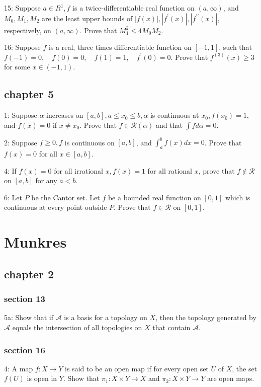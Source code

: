 \documentclass{article}
\begin{document}
15: Suppose $a \in R^{1}, f$ is a twice-differentiable real function on $(a, \infty)$, and $M_{0}, M_{1}, M_{2}$ are the least upper bounds of $|f(x)|,\left|f^{\prime}(x)\right|,\left|f^{\prime \prime}(x)\right|$, respectively, on $(a, \infty)$. Prove that $M_{1}^{2} \leq 4 M_{0} M_{2} .$

16: Suppose $f$ is a real, three times differentiable function on $[-1,1]$, such that
$f(-1)=0, \quad f(0)=0, \quad f(1)=1, \quad f^{\prime}(0)=0 .$ Prove that $f^{(3)}(x) \geq 3$ for some $x \in(-1,1)$.

\subsection*{chapter 5}
1: Suppose $\alpha$ increases on $[a, b], a \leq x_{0} \leq b, \alpha$ is continuous at $x_{0}, f\left(x_{0}\right)=1$, and $f(x)=0$ if $x \neq x_{0}$. Prove that $f \in \mathscr{R}(\alpha)$ and that $\int f d \alpha=0$.

2: Suppose $f \geq 0, f$ is continuous on $[a, b]$, and $\int_{a}^{b} f(x) d x=0$. Prove that $f(x)=0$ for all $x \in[a, b]$.

4: If $f(x)=0$ for all irrational $x, f(x)=1$ for all rational $x$, prove that $f \notin \mathscr{R}$ on $[a, b]$ for any $a<b$.

6: Let $P$ be the Cantor set. Let $f$ be a bounded real function on $[0,1]$ which is continuous at every point outside $P$. Prove that $f \in \mathscr{R}$ on $[0,1]$.

\section*{Munkres}
\subsection*{chapter 2}
\subsubsection*{section 13}
5a: Show that if $\mathcal{A}$ is a basis for a topology on $X$, then the topology generated by $\mathcal{A}$ equals the intersection of all topologies on $X$ that contain $\mathcal{A}$. 

\subsubsection*{section 16}
4: A map $f: X \rightarrow Y$ is said to be an open map if for every open set $U$ of $X$, the set $f(U)$ is open in $Y$. Show that $\pi_{1}: X \times Y \rightarrow X$ and $\pi_{2}: X \times Y \rightarrow Y$ are open maps.
\end{document}
